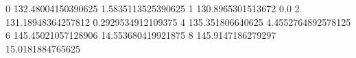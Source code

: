 0 132.48004150390625 1.5835113525390625
1 130.8965301513672 0.0
2 131.18948364257812 0.2929534912109375
4 135.351806640625 4.4552764892578125
6 145.45021057128906 14.553680419921875
8 145.9147186279297 15.0181884765625
